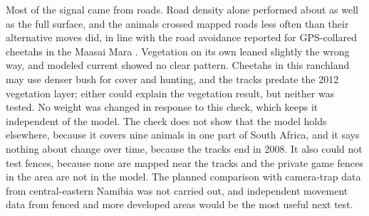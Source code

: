 Most of the signal came from roads. Road density alone performed about as well as the full surface, and the animals crossed mapped roads less often than their alternative moves did, in line with the road avoidance reported for GPS-collared cheetahs in the Maasai Mara \parencite{klaassen2018edge}. Vegetation on its own leaned slightly the wrong way, and modeled current showed no clear pattern. Cheetahs in this ranchland may use denser bush for cover and hunting, and the tracks predate the 2012 vegetation layer; either could explain the vegetation result, but neither was tested. No weight was changed in response to this check, which keeps it independent of the model. The check does not show that the model holds elsewhere, because it covers nine animals in one part of South Africa, and it says nothing about change over time, because the tracks end in 2008. It also could not test fences, because none are mapped near the tracks and the private game fences in the area are not in the model. The planned comparison with camera-trap data from central-eastern Namibia \parencite{verschueren2024guild} was not carried out, and independent movement data from fenced and more developed areas would be the most useful next test.
